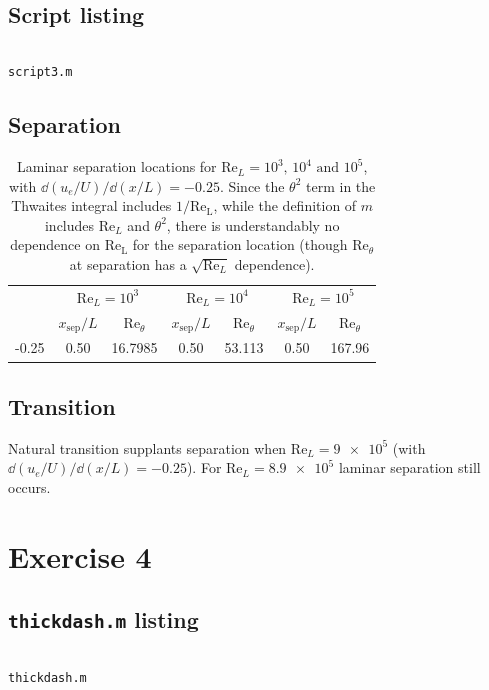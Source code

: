 \documentclass[12pt]{article}
\newenvironment{longlisting}{\captionsetup{type=listing}}{}
\begin{document}
\subsection{Script listing}
\begin{longlisting}
    \centering
    \inputminted{matlab}{../script3.m}
    \label{lst:script3}
    \caption{\texttt{script3.m}}
\end{longlisting}
\subsection{Separation}
\begin{table}[H]
    \centering
    \begin{tabular}{S[round-mode = none]cccccc}
        \toprule
         {} &  &  &  \\ \cmidrule(lr){2-3} \cmidrule(lr){4-5} \cmidrule(lr){6-7}
         & {$x_\mathrm{sep}/L$} & {$\mathrm{Re}_\theta$} & {$x_\mathrm{sep}/L$} & {$\mathrm{Re}_\theta$} & {$x_\mathrm{sep}/L$} & {$\mathrm{Re}_\theta$} \\  & \num{0.50} & \num{16.7985} & \num{0.50} & \num{53.113} & \num{0.50} & \num{167.96} \\
         \bottomrule
    \end{tabular}
    \caption{Laminar separation locations for $\mathrm{Re}_L = 10^3,\,10^4\text{ and }10^5$, with $\dd{(u_e/U)}/\dd{(x/L)}=-0.25$. Since the $\theta^2$ term in the Thwaites integral includes $1/\mathrm{Re_L}$, while the definition of $m$ includes $\mathrm{Re}_L$ and $\theta^2$, there is understandably no dependence on $\mathrm{Re_L}$ for the separation location (though $\mathrm{Re}_\theta$ at separation has a $\sqrt{\mathrm{Re}_L}$ dependence).}
    \label{tab:transition_locations}
\end{table}
\subsection{Transition}
Natural transition supplants separation when $\mathrm{Re}_L=\num{9e5}$ (with $\dd{(u_e/U)}/\dd{(x/L)}=-0.25$). For $\mathrm{Re}_L=\num{8.9e5}$ laminar separation still occurs.
\section{Exercise 4}
\subsection{\texttt{thickdash.m} listing}
\begin{listing}[H]
    \centering
    \inputminted{matlab}{../thickdash.m}
    \label{lst:thickdash}
    \caption{\texttt{thickdash.m}}
\end{listing}
\end{document}

